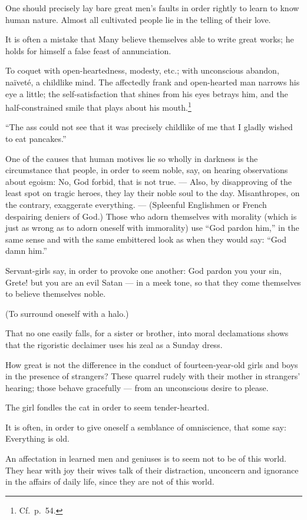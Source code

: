 \documentclass[12pt]{article}
\newcommand{\opage}[1]{\marginnote{\footnotesize\textit{[#1]}}}
\begin{document}
One should precisely lay bare great men's faults in order rightly to learn to know human nature. Almost all cultivated people lie in the telling of their love.

It is often a mistake that Many believe themselves able to write great works; he holds for himself a false feast of annunciation.

To coquet with open-heartedness, modesty, etc.; with unconscious abandon, naïveté, a childlike mind. The affectedly frank and open-hearted man narrows his eye a little; the self-satisfaction that shines from his eyes betrays him, and the half-constrained smile that plays about his mouth.\footnote{Cf.\ p.\ 54.}

``The ass could not see that it was precisely childlike of me that I gladly wished to eat pancakes.''

One of the causes that human motives lie so wholly in darkness is the circumstance that people, in order to seem noble, say, on hearing observations about egoism: No, God forbid, that is not true. --- Also, by disapproving of the least spot on tragic heroes, they lay their noble soul to the day. Misanthropes, on the contrary, exaggerate everything. --- (Spleenful Englishmen or French despairing deniers of God.) \opage{179}Those who adorn themselves with morality (which is just as wrong as to adorn oneself with immorality) use ``God pardon him,'' in the same sense and with the same embittered look as when they would say: ``God damn him.''

Servant-girls say, in order to provoke one another: God pardon you your sin, Grete! but you are an evil Satan --- in a meek tone, so that they come themselves to believe themselves noble.

(To surround oneself with a halo.)

That no one easily falls, for a sister or brother, into moral declamations shows that the rigoristic declaimer uses his zeal as a Sunday dress.

How great is not the difference in the conduct of fourteen-year-old girls and boys in the presence of strangers? These quarrel rudely with their mother in strangers' hearing; those behave gracefully --- from an unconscious desire to please.

The girl fondles the cat in order to seem tender-hearted.

It is often, in order to give oneself a semblance of omniscience, that some say: Everything is old.

An affectation in learned men and geniuses is to seem not to be of this world. They hear with joy their wives talk of their distraction, unconcern and ignorance in the affairs of daily life, since they are not of this world.
\end{document}
